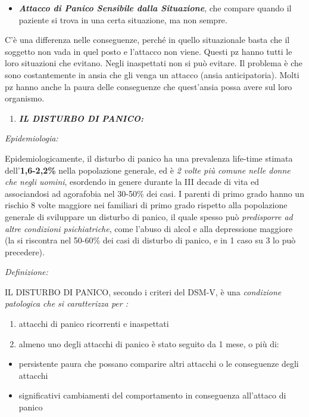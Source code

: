 \documentclass[]{article}
\begin{document}
\begin{itemize}
\item
  \textbf{\emph{Attacco di Panico Sensibile dalla Situazione}}, che
  compare quando il paziente si trova in una certa situazione, ma non
  sempre.
\end{itemize}

C'è una differenza nelle conseguenze, perché in quello situazionale
basta che il soggetto non vada in quel posto e l'attacco non viene.
Questi pz hanno tutti le loro situazioni che evitano. Negli inaspettati
non si può evitare. Il problema è che sono costantemente in ansia che
gli venga un attacco (ansia anticipatoria). Molti pz hanno anche la
paura delle conseguenze che quest'ansia possa avere sul loro organismo.

\begin{enumerate}
\def\labelenumi{\arabic{enumi}.}
\item
  \textbf{\emph{IL DISTURBO DI PANICO:}}
\end{enumerate}

\emph{\emph{Epidemiologia:}}

Epidemiologicamente, il disturbo di panico ha una prevalenza life-time
stimata dell'\textbf{1,6-2,2\%} nella popolazione generale, ed è \emph{2
volte più comune nelle donne che negli uomini}, esordendo in genere
durante la III decade di vita ed associandosi ad agorafobia nel 30-50\%
dei casi. I parenti di primo grado hanno un rischio 8 volte maggiore nei
familiari di primo grado rispetto alla popolazione generale di
sviluppare un disturbo di panico, il quale spesso può \emph{predisporre
ad altre condizioni psichiatriche}, come l'abuso di alcol e alla
depressione maggiore (la si riscontra nel 50-60\% dei casi di disturbo
di panico, e in 1 caso su 3 lo può precedere).

\emph{\emph{Definizione:}}

IL DISTURBO DI PANICO, secondo i criteri del DSM-V, è una
\emph{condizione patologica che si caratterizza per :}

\begin{enumerate}
\def\labelenumi{\arabic{enumi}.}
\item
  attacchi di panico ricorrenti e inaspettati
\item
  almeno uno degli attacchi di panico è stato seguito da 1 mese, o più
  di:
\end{enumerate}

\begin{itemize}
\item
  persistente paura che possano comparire altri attacchi o le
  conseguenze degli attacchi
\item
  significativi cambiamenti del comportamento in conseguenza all'attaco
  di panico
\end{itemize}
\end{document}
